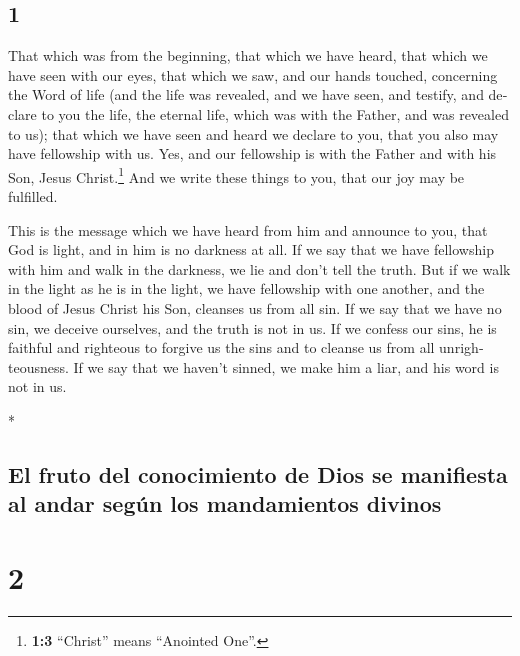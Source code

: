 \begin{paracol}{2}
\switchcolumn
\begin{otherlanguage}{english}

\hypertarget{section-1}{%
\section{1}\label{section-1}}

 That which was from the beginning, that which we have
heard, that which we have seen with our eyes, that which we saw, and our
hands touched, concerning the Word of life  (and the life
was revealed, and we have seen, and testify, and declare to you the
life, the eternal life, which was with the Father, and was revealed to
us);  that which we have seen and heard we declare to you,
that you also may have fellowship with us. Yes, and our fellowship is
with the Father and with his Son, Jesus Christ.\footnote{\textbf{1:3}
  ``Christ'' means ``Anointed One''.}  And we write these
things to you, that our joy may be fulfilled.

 This is the message which we have heard from him and
announce to you, that God is light, and in him is no darkness at all.
 If we say that we have fellowship with him and walk in
the darkness, we lie and don't tell the truth.  But if we
walk in the light as he is in the light, we have fellowship with one
another, and the blood of Jesus Christ his Son, cleanses us from all
sin.  If we say that we have no sin, we deceive ourselves,
and the truth is not in us.  If we confess our sins, he is
faithful and righteous to forgive us the sins and to cleanse us from all
unrighteousness.  If we say that we haven't sinned, we
make him a liar, and his word is not in us.

\end{otherlanguage}

\switchcolumn[0]*

\hypertarget{el-fruto-del-conocimiento-de-dios-se-manifiesta-al-andar-seguxfan-los-mandamientos-divinos}{%
\subsection{El fruto del conocimiento de Dios se manifiesta al andar
según los mandamientos
divinos}\label{el-fruto-del-conocimiento-de-dios-se-manifiesta-al-andar-seguxfan-los-mandamientos-divinos}}

\hypertarget{section-2}{%
\section{2}\label{section-2}}


\end{paracol}
